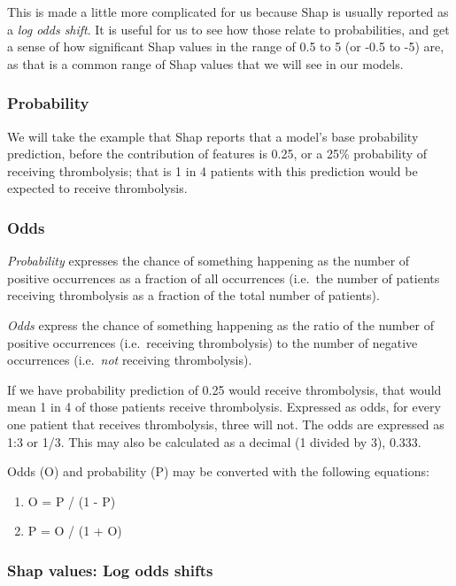 This is made a little more complicated for us because Shap is usually
reported as a \emph{log odds shift}. It is useful for us to see how
those relate to probabilities, and get a sense of how significant Shap
values in the range of 0.5 to 5 (or -0.5 to -5) are, as that is a common
range of Shap values that we will see in our models.

\subsubsection{Probability}

We will take the example that Shap reports that a model's base
probability prediction, before the contribution of features is 0.25, or
a 25\% probability of receiving thrombolysis; that is 1 in 4 patients
with this prediction would be expected to receive thrombolysis.

\subsubsection{Odds}

\emph{Probability} expresses the chance of something happening as the
number of positive occurrences as a fraction of all occurrences
(i.e.~the number of patients receiving thrombolysis as a fraction of the
total number of patients).

\emph{Odds} express the chance of something happening as the ratio of
the number of positive occurrences (i.e.~receiving thrombolysis) to the
number of negative occurrences (i.e.~\emph{not} receiving thrombolysis).

If we have probability prediction of 0.25 would receive thrombolysis,
that would mean 1 in 4 of those patients receive thrombolysis. Expressed
as odds, for every one patient that receives thrombolysis, three will
not. The odds are expressed as 1:3 or 1/3. This may also be calculated
as a decimal (1 divided by 3), 0.333.

Odds (O) and probability (P) may be converted with the following
equations:

\begin{enumerate}
\def\labelenumi{(\arabic{enumi})}
\item
  O = P / (1 - P)
\item
  P = O / (1 + O)
\end{enumerate}

\subsubsection{Shap values: Log odds shifts}

